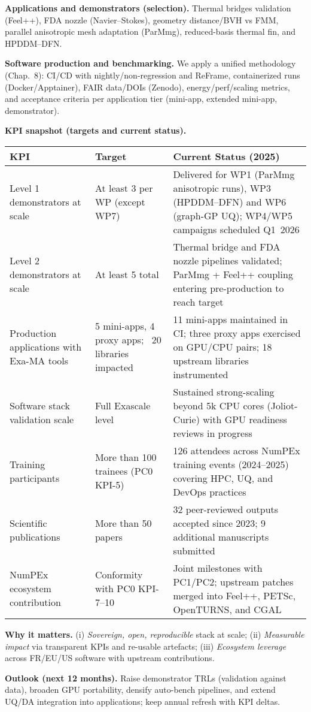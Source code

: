 \medskip
\noindent
\textbf{Applications and demonstrators (selection).}
Thermal bridges validation (Feel++), FDA nozzle (Navier–Stokes), geometry distance/BVH vs FMM,
parallel anisotropic mesh adaptation (ParMmg), reduced-basis thermal fin, and HPDDM–DFN. %

\medskip
\noindent
\textbf{Software production and benchmarking.}
We apply a unified methodology (Chap.~8): CI/CD with nightly/non-regression and ReFrame,
containerized runs (Docker/Apptainer), FAIR data/DOIs (Zenodo), energy/perf/scaling metrics,
and acceptance criteria per application tier (mini-app, extended mini-app, demonstrator). %

\medskip
\noindent
\textbf{KPI snapshot (targets and current status).}
\begin{center}
\begin{tabular}{l p{6cm} p{4cm}}
\toprule
\textbf{KPI} & \textbf{Target} & \textbf{Current Status (2025)} \\
\midrule
Level 1 demonstrators at scale & At least 3 per WP (except WP7) & Delivered for WP1 (ParMmg anisotropic runs), WP3 (HPDDM--DFN) and WP6 (graph-GP UQ); WP4/WP5 campaigns scheduled Q1~2026 \\
Level 2 demonstrators at scale & At least 5 total & Thermal bridge and FDA nozzle pipelines validated; ParMmg + Feel++ coupling entering pre-production to reach target \\
Production applications with Exa-MA tools & 5 mini-apps, 4 proxy apps; ~20 libraries impacted & 11 mini-apps maintained in CI; three proxy apps exercised on GPU/CPU pairs; 18 upstream libraries instrumented \\
Software stack validation scale & Full Exascale level & Sustained strong-scaling beyond 5k CPU cores (Joliot-Curie) with GPU readiness reviews in progress \\
Training participants & More than 100 trainees (PC0 KPI-5) & 126 attendees across NumPEx training events (2024--2025) covering HPC, UQ, and DevOps practices \\
Scientific publications & More than 50 papers & 32 peer-reviewed outputs accepted since 2023; 9 additional manuscripts submitted \\
NumPEx ecosystem contribution & Conformity with PC0 KPI-7--10 & Joint milestones with PC1/PC2; upstream patches merged into Feel++, PETSc, OpenTURNS, and CGAL \\
\bottomrule
\end{tabular}
\end{center}

\medskip
\noindent
\textbf{Why it matters.} (i) \emph{Sovereign, open, reproducible} stack at scale; (ii) \emph{Measurable
impact} via transparent KPIs and re-usable artefacts; (iii) \emph{Ecosystem leverage} across FR/EU/US
software with upstream contributions.

\medskip
\noindent
\textbf{Outlook (next 12 months).}
Raise demonstrator TRLs (validation against data), broaden GPU portability, densify auto-bench
pipelines, and extend UQ/DA integration into applications; keep annual refresh with KPI deltas.


